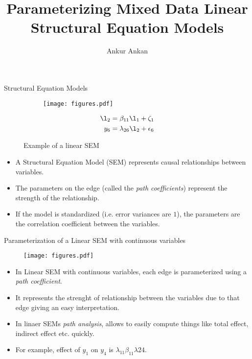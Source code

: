\documentclass{beamer}
\begin{document}
\title[]{Parameterizing Mixed Data Linear Structural Equation Models}
\author{Ankur Ankan}
\date{}

\maketitle

\begin{frame}{Structural Equation Models}
	\begin{figure}
		\centering
		\begin{subfigure}{0.6 \textwidth}
			\centering
			\texttt{[image: figures.pdf]}
		\end{subfigure}%
		\begin{subfigure}{0.4 \textwidth}
			\centering
			\begin{equation*}
				\begin{split}
					\l_2 &= \beta_{11} \l_1 + \zeta_1 \\
					y_6 &= \lambda_{26} \l_2 + \epsilon_6 \\
				\end{split}
			\end{equation*}
		\end{subfigure}	
		\caption{Example of a linear SEM }
	\end{figure}

	\begin{itemize}
		\item A Structural Equation Model (SEM) represents causal relationships between variables.
		\item The parameters on the edge (called the \emph{path
			coefficients}) represent the strength of the
			relationship.
		\item If the model is standardized (i.e. error variances are $
			1 $), the parameters are the correlation coefficient
			between the variables.
	\end{itemize}
\end{frame}

\begin{frame}{Parameterization of a Linear SEM with continuous variables}
	\begin{figure}
		\centering
		\texttt{[image: figures.pdf]}
	\end{figure}
	\begin{itemize}
		\item In Linear SEM with continuous variables, each edge is parameterized
			using a \emph{path coefficient}.
		\item It represents the strenght of relationship between the
			variables due to that edge giving an easy
			interpretation.
		\item In linaer SEMs \emph{path analysis}, allows to easily
			compute things like total effect, indirect effect etc.
			quickly.
		\item For example, effect of $ y_1 $ on $ y_4 $ is $
			\lambda_{11} \beta_{11} \lambda{24} $.
	\end{itemize}
\end{frame}
\end{document}
